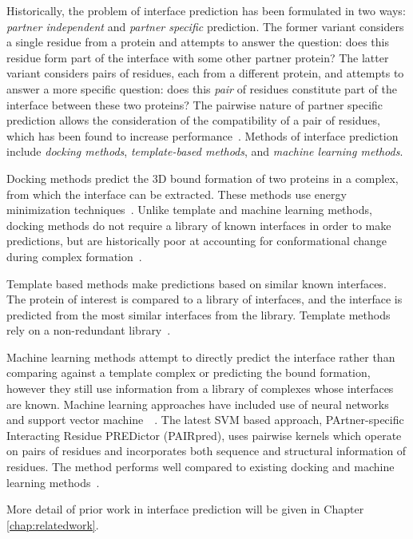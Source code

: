 Historically, the problem of interface prediction has been formulated in two ways: \textit{partner independent} and \textit{partner specific} prediction.
The former variant considers a single residue from a protein and attempts to answer the question: does this residue form part of the interface with some other partner protein?
The latter variant considers pairs of residues, each from a different protein, and attempts to answer a more specific question: does this \textit{pair} of residues constitute part of the interface between these two proteins?
The pairwise nature of partner specific prediction allows the consideration of the compatibility of a pair of residues, which has been found to increase performance~\cite{ahmad2011}\cite{minhas2014}.
Methods of interface prediction include \textit{docking methods}, \textit{template-based methods}, and \textit{machine learning methods}.

Docking methods predict the 3D bound formation of two proteins in a complex, from which the interface can be extracted. 
These methods use energy minimization techniques~\cite{chen2003}\cite{zundert2016}.
Unlike template and machine learning methods, docking methods do not require a library of known interfaces in order to make predictions, but are historically poor at accounting for conformational change during complex formation~\cite{ezkurdia2009}.

Template based methods make predictions based on similar known interfaces.
The protein of interest is compared to a library of interfaces, and the interface is predicted from the most similar interfaces from the library.
Template methods rely on a non-redundant library~\cite{tuncbag2011}.

Machine learning methods attempt to directly predict the interface rather than comparing against a template complex or predicting the bound formation, however they still use information from a library of complexes whose interfaces are known.
Machine learning approaches have included use of neural networks and support vector machine~\cite{ahmad2011}~\cite{minhas2014}.
The latest SVM based approach, PArtner-specific Interacting Residue PREDictor (PAIRpred), uses pairwise kernels which operate on pairs of residues and incorporates both sequence and structural information of residues.
The method performs well compared to existing docking and machine learning methods~\cite{minhas2014}.

More detail of prior work in interface prediction will be given in Chapter \ref{chap:relatedwork}.